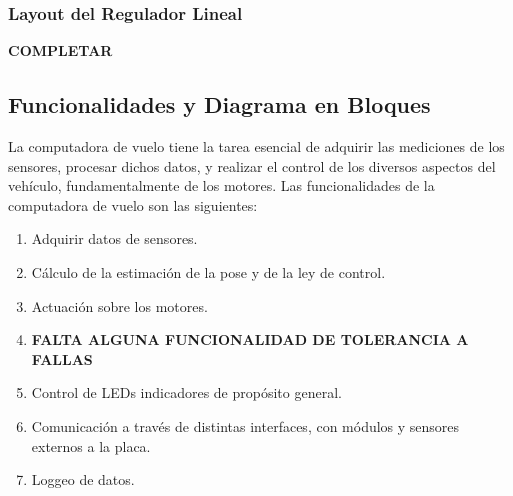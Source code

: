 \subsubsection{Layout del Regulador Lineal}

\textbf{{\color{red} COMPLETAR}}

\subsection{Funcionalidades y Diagrama en Bloques}



La computadora de vuelo tiene la tarea esencial de adquirir las mediciones de los sensores, procesar dichos datos, y realizar el control de los diversos aspectos del vehículo, fundamentalmente de los motores. Las funcionalidades de la computadora de vuelo son las siguientes:

\begin{enumerate}
    \item Adquirir datos de sensores.
    \item Cálculo de la estimación de la pose y de la ley de control.
    \item Actuación sobre los motores.
    \item \textbf{{\color{red} FALTA ALGUNA FUNCIONALIDAD DE TOLERANCIA A FALLAS}}
    \item Control de LEDs indicadores de propósito general.
    \item Comunicación a través de distintas interfaces, con módulos y sensores externos a la placa.
    \item Loggeo de datos.
\end{enumerate}

